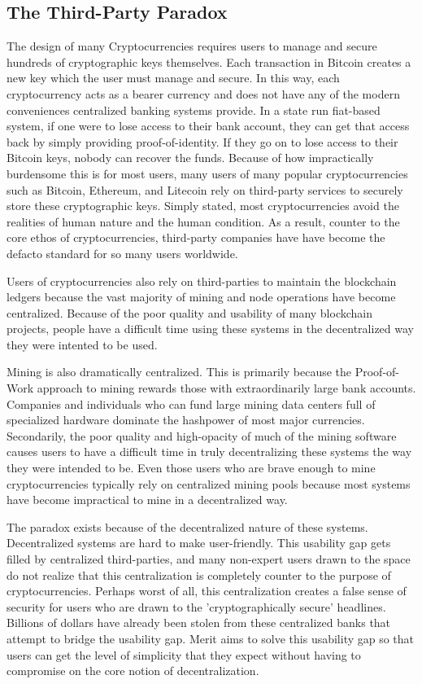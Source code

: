 \documentclass{article}
\begin{document}
\subsection{The Third-Party Paradox}

The design of many Cryptocurrencies requires users to manage and secure hundreds
of cryptographic keys themselves. Each \gls{transaction} in \gls{Bitcoin} creates
a new key which the user must manage and secure. In this way, each cryptocurrency
acts as a \gls{bearer currency} and does not have any of the modern conveniences
centralized banking systems provide. In a state run fiat-based system, if one 
were to lose access to their bank account, they can get that access back 
by simply providing proof-of-identity. If they go on to lose access to their 
\gls{Bitcoin} keys, nobody can recover the funds. Because of how impractically 
burdensome this is for most users, many users of many popular cryptocurrencies 
such as \gls{Bitcoin}, \gls{Ethereum}, and \gls{Litecoin} rely on third-party
services to securely store these cryptographic keys. Simply stated, most
cryptocurrencies avoid the realities of human nature and the human condition. 
As a result, counter to the core ethos of cryptocurrencies, third-party companies
have have become the defacto standard for so many users worldwide.

Users of cryptocurrencies also rely on third-parties to maintain the blockchain ledgers
because the vast majority of mining and node operations have become centralized.
Because of the poor quality and usability of many blockchain projects, people 
have a difficult time using these systems in the decentralized way they were intented to be used.  

Mining is also dramatically centralized.  This is primarily because the Proof-of-Work 
approach to mining rewards those with extraordinarily large bank accounts. Companies 
and individuals who can fund large mining data centers full of specialized hardware 
dominate the hashpower of most major currencies.  \cite{drypool} Secondarily, 
the poor quality and high-opacity of much of the mining software causes users 
to have a difficult time in truly decentralizing these systems the way they 
were intended to be. Even those users who are brave enough to mine cryptocurrencies
typically rely on centralized mining pools because most systems have become
impractical to mine in a decentralized way.

The paradox exists because of the decentralized nature of these systems. Decentralized
systems are hard to make user-friendly. This usability gap gets filled by centralized
third-parties, and many non-expert users drawn to the space do not realize that this
centralization is completely counter to the purpose of cryptocurrencies.  Perhaps
worst of all, this centralization creates a false sense of security for users who 
are drawn to the 'cryptographically secure' headlines.  Billions of dollars have 
already been stolen from these centralized banks that attempt to bridge the usability gap.  
Merit aims to solve this usability gap so that users can get the level of simplicity
that they expect without having to compromise on the core notion of decentralization.  
\end{document}
